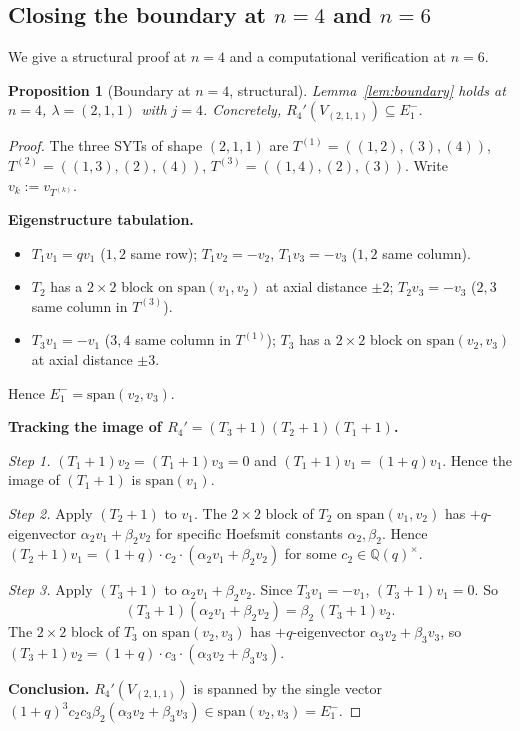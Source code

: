 \documentclass[11pt]{article}
\newtheorem{proposition}[theorem]{Proposition}
\theoremstyle{definition}
\begin{document}
\subsection{Closing the boundary at $n=4$ and $n=6$}

We give a structural proof at $n=4$ and a computational verification
at $n=6$.

\begin{proposition}[Boundary at $n=4$, structural]\label{prop:boundary-n4}
Lemma~\ref{lem:boundary} holds at $n=4$, $\lambda=(2,1,1)$ with
$j=4$. Concretely, $R_4'(V_{(2,1,1)})\subseteq E_1^-$.
\end{proposition}

\begin{proof}
The three SYTs of shape $(2,1,1)$ are
$T^{(1)}=((1,2),(3),(4))$, $T^{(2)}=((1,3),(2),(4))$,
$T^{(3)}=((1,4),(2),(3))$. Write $v_k:=v_{T^{(k)}}$.

\medskip
\noindent\textbf{Eigenstructure tabulation.}
\begin{itemize}[leftmargin=2em,topsep=0.3em,itemsep=0.2em]
\item $T_1 v_1 = q v_1$ ($1,2$ same row); $T_1 v_2 = -v_2$, $T_1 v_3=-v_3$
($1,2$ same column).
\item $T_2$ has a $2\times 2$ block on
$\mathrm{span}(v_1,v_2)$ at axial distance $\pm 2$;
$T_2 v_3=-v_3$ ($2,3$ same column in $T^{(3)}$).
\item $T_3 v_1 = -v_1$ ($3,4$ same column in $T^{(1)}$);
$T_3$ has a $2\times 2$ block on $\mathrm{span}(v_2,v_3)$ at axial
distance $\pm 3$.
\end{itemize}
Hence $E_1^- = \mathrm{span}(v_2,v_3)$.

\medskip
\noindent\textbf{Tracking the image of $R_4'=(T_3{+}1)(T_2{+}1)(T_1{+}1)$.}

\emph{Step 1.} $(T_1{+}1)v_2=(T_1{+}1)v_3=0$ and $(T_1{+}1)v_1=(1{+}q)v_1$.
Hence the image of $(T_1{+}1)$ is $\mathrm{span}(v_1)$.

\emph{Step 2.} Apply $(T_2{+}1)$ to $v_1$. The $2\times 2$ block of $T_2$
on $\mathrm{span}(v_1,v_2)$ has $+q$-eigenvector
$\alpha_2 v_1 + \beta_2 v_2$ for specific Hoefsmit constants
$\alpha_2,\beta_2$. Hence
$(T_2{+}1)v_1 = (1{+}q)\cdot c_2\cdot (\alpha_2 v_1 + \beta_2 v_2)$
for some $c_2\in\mathbb{Q}(q)^\times$.

\emph{Step 3.} Apply $(T_3{+}1)$ to $\alpha_2 v_1 + \beta_2 v_2$.
Since $T_3 v_1=-v_1$, $(T_3{+}1)v_1=0$. So
\[
   (T_3{+}1)(\alpha_2 v_1 + \beta_2 v_2)
   = \beta_2\,(T_3{+}1)v_2.
\]
The $2\times 2$ block of $T_3$ on $\mathrm{span}(v_2,v_3)$ has
$+q$-eigenvector $\alpha_3 v_2 + \beta_3 v_3$, so
$(T_3{+}1)v_2 = (1{+}q)\cdot c_3\cdot(\alpha_3 v_2+\beta_3 v_3)$.

\medskip
\noindent\textbf{Conclusion.}
$R_4'(V_{(2,1,1)})$ is spanned by the single vector
$(1{+}q)^3 c_2 c_3 \beta_2 (\alpha_3 v_2+\beta_3 v_3)\in
\mathrm{span}(v_2,v_3)=E_1^-$.
\end{proof}
\end{document}
